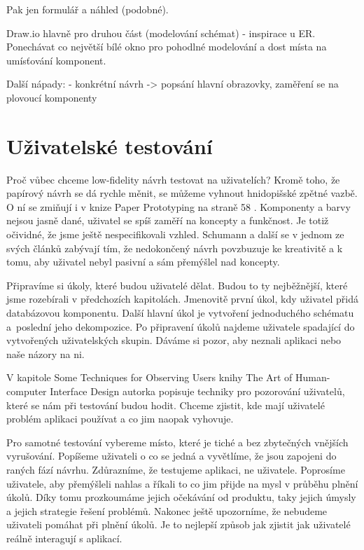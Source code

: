 Pak jen formulář a náhled (podobné).

Draw.io hlavně pro druhou část (modelování schémat) - inspirace u ER. Ponechávat co největší bílé okno pro pohodlné modelování a dost místa na umísťování komponent.

Další nápady:
- konkrétní návrh -> popsání hlavní obrazovky, zaměření se na plovoucí komponenty

\section{Uživatelské testování}

Proč vůbec chceme low-fidelity návrh testovat na uživatelích? Kromě toho, že papírový návrh se dá rychle měnit, se můžeme vyhnout hnidopišské zpětné vazbě. O ní se zmiňují i v knize Paper Prototyping na straně 58 \cite{Paper_Prototyping}. Komponenty a barvy nejsou jasně dané, uživatel se spíš zaměří na koncepty a funkčnost. Je totiž očividné, že jsme ještě nespecifikovali vzhled. Schumann a další se v jednom ze svých článků \cite{Schumann_1996_AEN} zabývají tím, že nedokončený návrh povzbuzuje ke kreativitě a k tomu, aby uživatel nebyl pasivní a sám přemýšlel nad koncepty. 

Připravíme si úkoly, které budou uživatelé dělat. Budou to ty nejběžnější, které jsme rozebírali v předchozích kapitolách. Jmenovitě první úkol, kdy uživatel přidá databázovou komponentu. Další hlavní úkol je vytvoření jednoduchého schématu a~poslední jeho dekompozice.
Po připravení úkolů najdeme uživatele spadající do vytvořených uživatelských skupin. Dáváme si pozor, aby neznali aplikaci nebo naše názory na ni.

V kapitole Some Techniques for Observing Users knihy The Art of Human-computer Interface Design \cite{Brenda_1990_art} autorka popisuje techniky pro pozorování uživatelů, které se nám při testování budou hodit. Chceme zjistit, kde mají uživatelé problém aplikaci používat a co jim naopak vyhovuje.

Pro samotné testování vybereme místo, které je tiché a bez zbytečných vnějších vyrušování. Popíšeme uživateli o co se jedná a vyvětlíme, že jsou zapojeni do raných fází návrhu. Zdůrazníme, že testujeme aplikaci, ne uživatele. Poprosíme uživatele, aby přemýšleli nahlas a říkali to co jim přijde na mysl v průběhu plnění úkolů. Díky tomu prozkoumáme jejich očekávání od produktu, taky jejich úmysly a jejich strategie řešení problémů. Nakonec ještě upozorníme, že nebudeme uživateli pomáhat při plnění úkolů. Je to nejlepší způsob jak zjistit jak uživatelé reálně interagují s aplikací.

